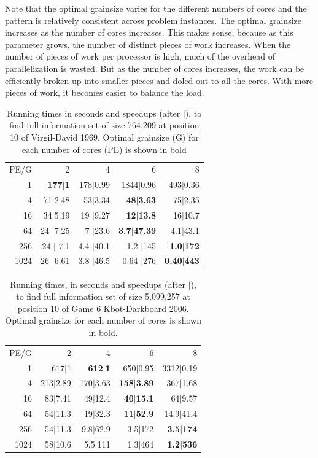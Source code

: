 \documentclass[times, 10pt,twocolumn]{article}
\begin{document}
Note that the optimal grainsize varies for the different numbers of cores and the pattern is relatively consistent across problem instances.  The optimal grainsize increases as the number of cores increases.  This makes sense, because as this parameter grows, the number of distinct pieces of work increases.  When the number of pieces of work per processor is high, much of the overhead of parallelization is wasted.  But as the number of cores increases, the work can be efficiently broken up into smaller pieces and doled out to all the cores.  With more pieces of work, it becomes easier to balance the load.

\begin{table}[tphb]
\centering
\begin{tabular}{rrrrr}
PE/G & 2 & 4 & 6 & 8 \\
1 & {\bf 177$|$1} & 178$|$0.99 & 1844$|$0.96 & 493$|$0.36 \\
4 & 71$|$2.48 & 53$|$3.34 & {\bf 48$|$3.63} & 75$|$2.35 \\
16 & 34$|$5.19 & 19 $|$9.27& {\bf 12$|$13.8} & 16$|$10.7 \\
64 & 24 $|$7.25 & 7 $|$23.6& {\bf 3.7$|$47.39} & 4.1$|$43.1 \\
256 & 24 $|$ 7.1& 4.4 $|$40.1 & 1.2 $|$145& {\bf 1.0$|$172} \\
1024 & 26 $|$6.61 & 3.8 $|$46.5& 0.64 $|$276& {\bf 0.40$|$443}
\end{tabular}
\caption{Running times in seconds and speedups (after $|$), to find full information set of size 764,209 at position 10 of Virgil-David 1969. Optimal grainsize (G) for each number of cores (PE) is shown in bold}
\vspace{-0.2in}
\label{tab:prob4}
\end{table}

\begin{table}[tphb]
\centering
\begin{tabular}{rrrrr}
PE/G & 2 & 4 & 6 & 8 \\
1 & 617$|$1 & {\bf 612$|$1} & 650$|$0.95 & 3312$|$0.19 \\
4 & 213$|$2.89 & 170$|$3.63 & {\bf 158$|$3.89} & 367$|$1.68 \\
16 & 83$|$7.41 & 49$|$12.4 & {\bf 40$|$15.1} & 64$|$9.57 \\
64 & 54$|$11.3 & 19$|$32.3 & {\bf 11$|$52.9} & 14.9$|$41.4 \\
256 & 54$|$11.3 & 9.8$|$62.9 & 3.5$|$172 & {\bf 3.5$|$174} \\
1024 & 58$|$10.6 & 5.5$|$111 & 1.3$|$464 & {\bf 1.2$|$536} \\
\end{tabular}
\caption{Running times, in seconds and speedups (after $|$), to find full information set of size 5,099,257 at position 10 of Game 6 Kbot-Darkboard 2006. Optimal grainsize for each number of cores is shown in bold.}
\vspace{-0.2in}
\label{tab:prob5}
\end{table}
\end{document}
